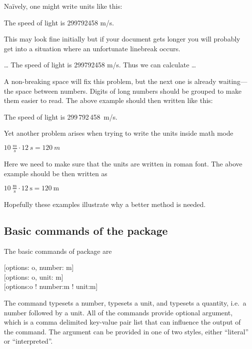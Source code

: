 Naïvely, one might write units like this:
\begin{example}[examplewidth=6cm]
The speed of light
is 299792458 m/s.
\end{example}
\noindent This may look fine initially but if your document gets longer you will probably
get into a situation where an unfortunate linebreak occurs.
\begin{example}[examplewidth=6cm]
\ldots{} The speed of light
is 299792458 m/s. Thus we
can calculate \ldots
\end{example}
\noindent A non-breaking space will fix this problem, but the next one is already waiting---the space between numbers. Digits of
long numbers should be grouped to make them easier to read. The above example
should then written like this:
\begin{example}[examplewidth=6cm]
The speed of light is
299\,792\,458~m/s.
\end{example}
\noindent Yet another problem arises when trying to write the units inside math
mode
\begin{example}[examplewidth=5cm]
$10~\frac{m}{s} \cdot 12~s = 120~m$
\end{example}
\noindent Here we need to make sure that the units are written in roman font.
The above example should be then written as
\begin{example}[examplewidth=5cm]
$10~\frac{\mathrm{m}}{\mathrm{s}} 
  \cdot 12~\mathrm{s} 
  = 120~\mathrm{m}$
\end{example}
\noindent Hopefully these examples illustrate why a better method is needed.

\subsection{Basic commands of the  package}

The basic commands of  package are
\begin{lscommand}
  [options: o, number: m]\\
  [options: o, unit: m]\\
  [options:o ! number:m ! unit:m]
\end{lscommand}
The  command typesets a number,  typesets a unit, and 
typesets a quantity, i.e.\ a number followed by a unit. All of the commands
provide optional  argument, which is a comma delimited key-value pair
list that can influence the output of the command. The  argument can
be provided in one of two styles, either \enquote{literal} or
\enquote{interpreted}.


